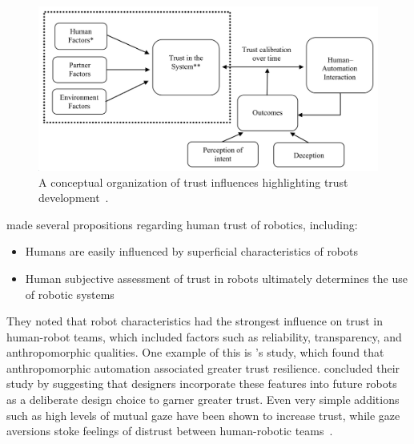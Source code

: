 \begin{figure}[b!]
    \begin{center}
        \includegraphics[width=0.8\linewidth]{figures/TradeStudy/figure4.png}
        \caption[A conceptual organization of trust influences highlighting trust development]{A conceptual organization of trust influences highlighting trust development~\citep{schaefer_meta-analysis_2016}.}
        \label{figure-hari:trust}
    \end{center}
\end{figure}

\citeauthor{ososky_building_2013} made several propositions regarding human trust of robotics, including:
\begin{itemize}
    \item Humans are easily influenced by superficial characteristics of robots
    \item Human subjective assessment of trust in robots ultimately determines the use of robotic systems
\end{itemize}
They noted that robot characteristics had the strongest influence on trust in human-robot teams, which included factors such as reliability, transparency, and anthropomorphic qualities.
One example of this is \citeauthor{de_visser_almost_2016}'s \citeyear{de_visser_almost_2016} study, which found that anthropomorphic automation associated greater trust resilience.
\citeauthor{de_visser_almost_2016} concluded their study by suggesting that designers incorporate these features into future robots as a deliberate design choice to garner greater trust.
Even very simple additions such as high levels of mutual gaze have been shown to increase trust, while gaze aversions stoke feelings of distrust between human-robotic teams~\citep{admoni_social_2017}.

